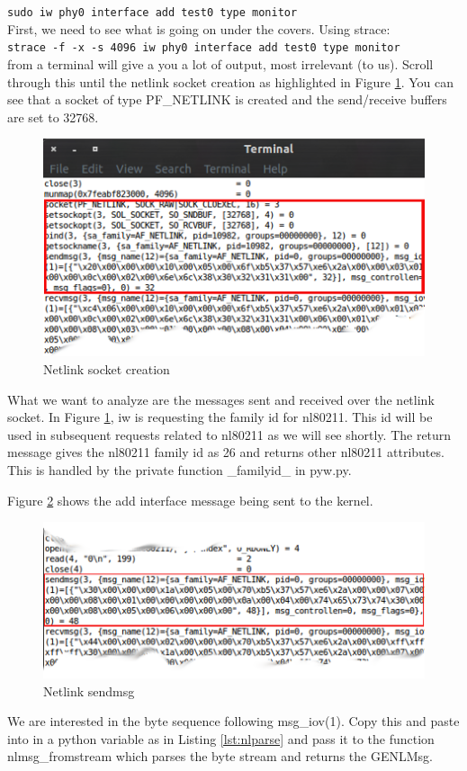 \documentclass[11pt]{article}
\begin{document}
    \texttt{sudo iw phy0 interface add test0 type monitor}\\
    
First, we need to see what is going on under the covers. Using strace:\\

    \texttt{strace -f -x -s 4096 iw phy0 interface add test0 type monitor}\\  

from a terminal will give a you a lot of output, most irrelevant (to us). Scroll
through this until the netlink socket creation as highlighted in Figure
\ref{fig:nlsock}. You can see that a socket of type PF\_NETLINK is created and
the send/receive buffers are set to 32768.
\begin{center}
\begin{figure}[h]
\includegraphics{nlsock}
\caption{Netlink socket creation}
\label{fig:nlsock}
\end{figure}
\end{center} 
What we want to analyze are the messages sent and received over the netlink 
socket. In Figure \ref{fig:nlsock}, iw is requesting the family id for nl80211. 
This id will be used in subsequent requests related to nl80211 as we will see 
shortly. The return message gives the nl80211 family id as 26 and returns other
nl80211 attributes. This is handled by the private function \_familyid\_ in 
pyw.py.

Figure \ref{fig:nlsend} shows the add interface message being sent to the kernel.
\begin{center}
\begin{figure}[h]
\includegraphics{nlsend}
\caption{Netlink sendmsg}
\label{fig:nlsend}
\end{figure}
\end{center} 
We are interested in the byte sequence following msg\_iov(1). Copy this and paste
into in a python variable as in Listing \ref{lst:nlparse} and pass it to the
function nlmsg\_fromstream which parses the byte stream and returns the GENLMsg.\\
\end{document}
